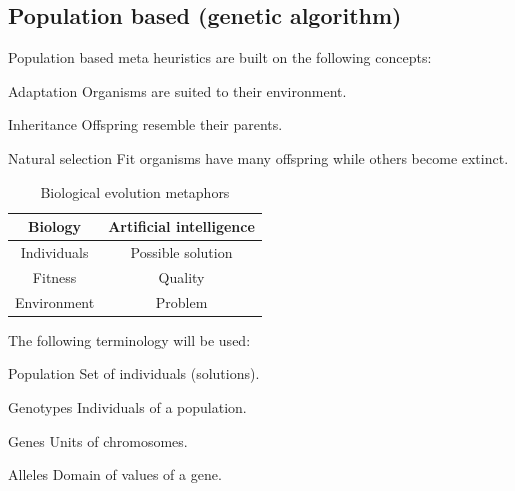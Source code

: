 \subsection{Population based (genetic algorithm)}

Population based meta heuristics are built on the following concepts:
\begin{descriptionlist}
    \item[Adaptation] Organisms are suited to their environment.
    \item[Inheritance] Offspring resemble their parents.
    \item[Natural selection] Fit organisms have many offspring while others become extinct.
\end{descriptionlist}

\begin{table}[H]
    \centering
    \begin{tabular}{c | c}
        \textbf{Biology} & \textbf{Artificial intelligence} \\
        \hline
        Individuals & Possible solution \\
        Fitness & Quality \\
        Environment & Problem \\
    \end{tabular}
    \caption{Biological evolution metaphors}
\end{table}

The following terminology will be used:
\begin{descriptionlist}
    \item[Population] Set of individuals (solutions).
    \item[Genotypes] Individuals of a population.
    \item[Genes] Units of chromosomes.
    \item[Alleles] Domain of values of a gene.
\end{descriptionlist}

